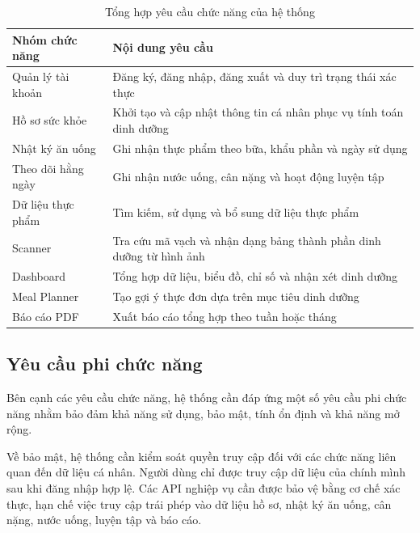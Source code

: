 \documentclass[12pt, a4paper]{report}
\begin{document}
\begin{table}[htbp]
    \centering
    \caption{Tổng hợp yêu cầu chức năng của hệ thống}
\label{tab:tong_hop_chuc_nang}
    \vspace{4pt}
    \renewcommand{\arraystretch}{1.3}
    \begin{tabular}{|>{\raggedright\arraybackslash}p{4cm}|p{11cm}|}
        \hline
        \textbf{Nhóm chức năng} & \textbf{Nội dung yêu cầu} \\
        \hline
        Quản lý tài khoản & Đăng ký, đăng nhập, đăng xuất và duy trì trạng thái xác thực \\
        \hline
        Hồ sơ sức khỏe & Khởi tạo và cập nhật thông tin cá nhân phục vụ tính toán dinh dưỡng \\
        \hline
        Nhật ký ăn uống & Ghi nhận thực phẩm theo bữa, khẩu phần và ngày sử dụng \\
        \hline
        Theo dõi hằng ngày & Ghi nhận nước uống, cân nặng và hoạt động luyện tập \\
        \hline
        Dữ liệu thực phẩm & Tìm kiếm, sử dụng và bổ sung dữ liệu thực phẩm \\
        \hline
        Scanner & Tra cứu mã vạch và nhận dạng bảng thành phần dinh dưỡng từ hình ảnh \\
        \hline
        Dashboard & Tổng hợp dữ liệu, biểu đồ, chỉ số và nhận xét dinh dưỡng \\
        \hline
        Meal Planner & Tạo gợi ý thực đơn dựa trên mục tiêu dinh dưỡng \\
        \hline
        Báo cáo PDF & Xuất báo cáo tổng hợp theo tuần hoặc tháng \\
        \hline
    \end{tabular}
\end{table}

\subsection{Yêu cầu phi chức năng}
Bên cạnh các yêu cầu chức năng, hệ thống cần đáp ứng một số yêu cầu phi chức năng nhằm bảo đảm khả năng sử dụng, bảo mật, tính ổn định và khả năng mở rộng.

Về bảo mật, hệ thống cần kiểm soát quyền truy cập đối với các chức năng liên quan đến dữ liệu cá nhân. Người dùng chỉ được truy cập dữ liệu của chính mình sau khi đăng nhập hợp lệ. Các API nghiệp vụ cần được bảo vệ bằng cơ chế xác thực, hạn chế việc truy cập trái phép vào dữ liệu hồ sơ, nhật ký ăn uống, cân nặng, nước uống, luyện tập và báo cáo.
\end{document}
